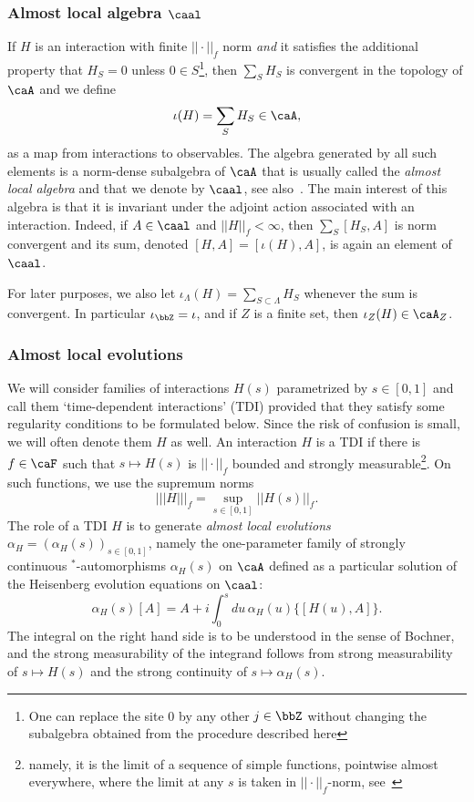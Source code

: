 \subsubsection{Almost local algebra $\caal$}\label{subsec:alal}

If $H$ is an interaction with finite $||\cdot||_f$ norm \emph{and} it satisfies the additional property that $H_S=0$ unless $0 \in S$\footnote{One can replace the site $0$ by any other $j\in\bbZ$ without changing the subalgebra obtained from the procedure described here},  then $\sum_{S} H_S$ is convergent in the topology of $\caA$ and we define
$$
\iota(H)= \sum_{S} H_S\in\caA,
$$
as a map from interactions to observables. The algebra generated by all such elements is a norm-dense subalgebra of $\caA$ that is usually called the \emph{almost local algebra} and that we denote by $\caal$, see also~\cite{kapustin2021classification}. The main interest of this algebra is that it is invariant under the adjoint action associated with an interaction. Indeed, if $A\in\caal$ and $||H||_f <\infty $, then $\sum_{S} [H_S,A]$ is norm convergent and its sum, denoted $[H,A] = [\iota(H),A]$, is again an element of $\caal$.

For later purposes, we also let $\iota_\Lambda(H) = \sum_{S\subset\Lambda} H_S$ whenever the sum is convergent. In particular $\iota_{\bbZ} = \iota$, and if $Z$ is a finite set, then $\iota_Z(H) \in \caA_Z$.

\subsubsection{Almost local evolutions}\label{ALEs}

We will consider families of interactions $H(s)$ parametrized by $s\in [0,1]$ and call them `time-dependent interactions' (TDI) provided that they satisfy some regularity conditions to be formulated below. Since the risk of confusion is small, we will often denote them $H$ as well. An interaction $H$ is a TDI if there is $f\in\caF$ such that $s\mapsto H(s)$ is $||\cdot||_f$ bounded and strongly measurable\footnote{namely, it is the limit of a sequence of simple functions, pointwise almost everywhere, where the limit at any $s$ is taken in $||\cdot||_f$-norm, see~\cite{diestel1978vector} }.  On such functions, we use the supremum norms 
$$
|||H |||_{f}=\sup_{s\in[0,1]} ||H(s)||_{f}.
$$
The role of a TDI $H$ is to generate \emph{almost local evolutions} $\alpha_H=(\alpha_H(s))_{s\in[0,1]}$, namely the one-parameter family of strongly continuous $^*$-automorphisms $\alpha_H(s)$ on $\caA$ defined as a particular solution of the Heisenberg evolution equations on $\caal$:
\begin{equation}\label{eq: heisenberg}
	\alpha_H(s)[A]= A +i\int_0^s du\, \alpha_H(u) \{ [H(u),A] \}.
\end{equation} 
The integral on the right hand side is to be understood in the sense of Bochner, and the strong measurability of the integrand follows from strong measurability of $s\mapsto H(s)$ and the strong continuity of $s\mapsto \alpha_H(s)$. 

